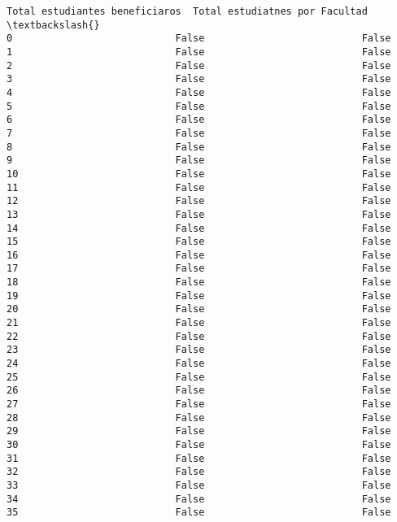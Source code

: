 \documentclass[11pt]{article}
\begin{document}
\begin{Verbatim}[commandchars=\\\{\}]
    Total estudiantes beneficiaros  Total estudiatnes por Facultad  \textbackslash{}
0                            False                           False   
1                            False                           False   
2                            False                           False   
3                            False                           False   
4                            False                           False   
5                            False                           False   
6                            False                           False   
7                            False                           False   
8                            False                           False   
9                            False                           False   
10                           False                           False   
11                           False                           False   
12                           False                           False   
13                           False                           False   
14                           False                           False   
15                           False                           False   
16                           False                           False   
17                           False                           False   
18                           False                           False   
19                           False                           False   
20                           False                           False   
21                           False                           False   
22                           False                           False   
23                           False                           False   
24                           False                           False   
25                           False                           False   
26                           False                           False   
27                           False                           False   
28                           False                           False   
29                           False                           False   
30                           False                           False   
31                           False                           False   
32                           False                           False   
33                           False                           False   
34                           False                           False   
35                           False                           False   

\end{Verbatim}
\end{document}
